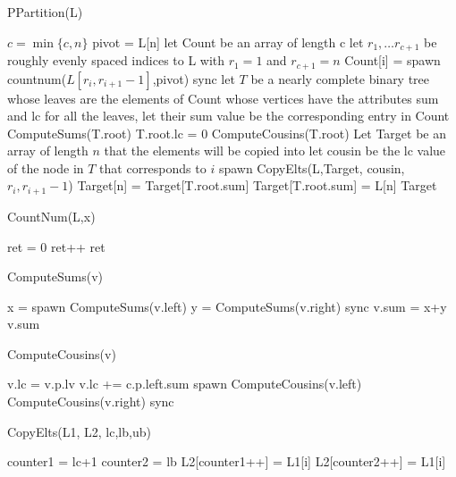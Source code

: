 \documentclass{article}
\begin{document}
\begin{algorithm}
\caption{PPartition(L)}
\begin{algorithmic}
\State $c= \min\{c,n\}$
\State pivot = L[n]
\State let Count be an array of length c
\State let $r_1, \ldots r_{c+1}$ be roughly evenly spaced indices to L with $r_1 = 1$ and $r_{c+1} = n$
\State Count[i] = spawn countnum($L[r_i,r_{i+1}-1]$,pivot)
\EndFor
\State sync
\State let $T$ be a nearly complete binary tree whose leaves are the elements of Count whose vertices have the attributes sum and lc
\State for all the leaves, let their sum value be the corresponding entry in Count
\State ComputeSums(T.root)
\State T.root.lc = 0
\State ComputeCousins(T.root)
\State Let Target be an array of length $n$ that the elements will be copied into
\State let cousin be the lc value of the node in $T$ that corresponds to $i$
\State spawn CopyElts(L,Target, cousin,$r_i,r_{i+1}-1$)
\EndFor
\State Target[n] = Target[T.root.sum]
\State Target[T.root.sum]  = L[n]
\State \Return Target
\end{algorithmic}
\end{algorithm}
\begin{algorithm}
\caption{CountNum(L,x)}
\begin{algorithmic}
\State ret = 0
\State ret++
\EndIf
\EndFor
\State \Return ret
\end{algorithmic}
\end{algorithm}
\begin{algorithm}
\caption{ComputeSums(v)}
\begin{algorithmic}
\State x = spawn ComputeSums(v.left)
\State y = ComputeSums(v.right)
\State sync
\State v.sum = x+y
\EndIf
\State \Return v.sum
\end{algorithmic}
\end{algorithm}
\begin{algorithm}
\caption{ComputeCousins(v)}
\begin{algorithmic}
\State v.lc = v.p.lv
\State v.lc += c.p.left.sum
\EndIf
\State spawn ComputeCousins(v.left)
\State ComputeCousins(v.right)
\State sync
\EndIf
\end{algorithmic}
\end{algorithm}
\begin{algorithm}
\caption{CopyElts(L1, L2, lc,lb,ub)}
\begin{algorithmic}
\State counter1 = lc+1
\State counter2 = lb
\State L2[counter1++] = L1[i]
\Else
\State L2[counter2++] = L1[i]
\EndIf
\EndFor
\end{algorithmic}
\end{algorithm}
\end{document}

